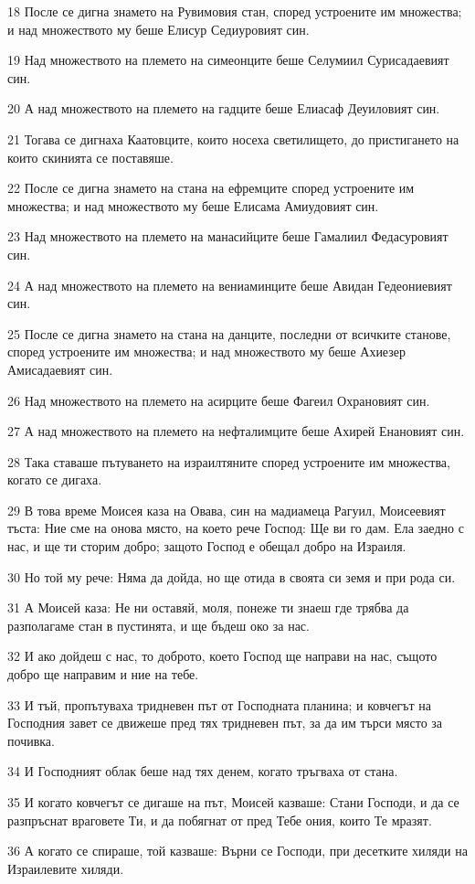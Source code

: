 \par 18 После се дигна знамето на Рувимовия стан, според устроените им множества; и над множеството му беше Елисур Седиуровият син.
\par 19 Над множеството на племето на симеонците беше Селумиил Сурисадаевият син.
\par 20 А над множеството на племето на гадците беше Елиасаф Деуиловият син.
\par 21 Тогава се дигнаха Каатовците, които носеха светилището, до пристигането на които скинията се поставяше.
\par 22 После се дигна знамето на стана на ефремците според устроените им множества; и над множеството му беше Елисама Амиудовият син.
\par 23 Над множеството на племето на манасийците беше Гамалиил Федасуровият син.
\par 24 А над множеството на племето на вениаминците беше Авидан Гедеониевият син.
\par 25 После се дигна знамето на стана на данците, последни от всичките станове, според устроените им множества; и над множеството му беше Ахиезер Амисадаевият син.
\par 26 Над множеството на племето на асирците беше Фагеил Охрановият син.
\par 27 А над множеството на племето на нефталимците беше Ахирей Енановият син.
\par 28 Така ставаше пътуването на израилтяните според устроените им множества, когато се дигаха.
\par 29 В това време Моисея каза на Овава, син на мадиамеца Рагуил, Моисеевият тъста: Ние сме на онова място, на което рече Господ: Ще ви го дам. Ела заедно с нас, и ще ти сторим добро; защото Господ е обещал добро на Израиля.
\par 30 Но той му рече: Няма да дойда, но ще отида в своята си земя и при рода си.
\par 31 А Моисей каза: Не ни оставяй, моля, понеже ти знаеш где трябва да разполагаме стан в пустинята, и ще бъдеш око за нас.
\par 32 И ако дойдеш с нас, то доброто, което Господ ще направи на нас, същото добро ще направим и ние на тебе.
\par 33 И тъй, пропътуваха тридневен път от Господната планина; и ковчегът на Господния завет се движеше пред тях тридневен път, за да им търси място за почивка.
\par 34 И Господният облак беше над тях денем, когато тръгваха от стана.
\par 35 И когато ковчегът се дигаше на път, Моисей казваше: Стани Господи, и да се разпръснат враговете Ти, и да побягнат от пред Тебе ония, които Те мразят.
\par 36 А когато се спираше, той казваше: Върни се Господи, при десетките хиляди на Израилевите хиляди.

